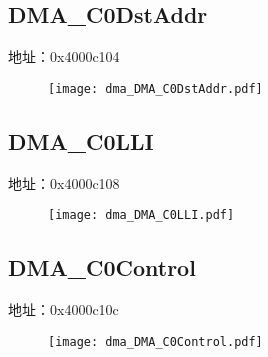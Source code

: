 \subsection{DMA\_C0DstAddr}
\label{dma-DMA-C0DstAddr}
地址：0x4000c104
 \begin{figure}[H]
\texttt{[image: dma\_DMA\_C0DstAddr.pdf]}
\end{figure}

\subsection{DMA\_C0LLI}
\label{dma-DMA-C0LLI}
地址：0x4000c108
 \begin{figure}[H]
\texttt{[image: dma\_DMA\_C0LLI.pdf]}
\end{figure}

\subsection{DMA\_C0Control}
\label{dma-DMA-C0Control}
地址：0x4000c10c
 \begin{figure}[H]
\texttt{[image: dma\_DMA\_C0Control.pdf]}
\end{figure}

